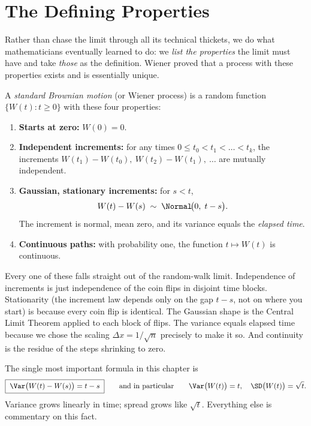 \section{The Defining Properties}
\label{ch29:definition}

Rather than chase the limit through all its technical thickets, we do what
mathematicians eventually learned to do: we \emph{list the properties} the limit
must have and take \emph{those} as the definition. Wiener proved that a process
with these properties exists and is essentially unique.

\begin{definition}
\label{ch29:def-bm}
A \emph{standard Brownian motion} (or Wiener process) is a random function
$\{W(t): t\ge 0\}$ with these four properties:
\begin{enumerate}
  \item \textbf{Starts at zero:} $W(0) = 0$.
  \item \textbf{Independent increments:} for any times
  $0 \le t_0 < t_1 < \dots < t_k$, the increments
  $W(t_1)-W(t_0),\ W(t_2)-W(t_1),\ \dots$ are mutually independent.
  \item \textbf{Gaussian, stationary increments:} for $s<t$,
  \[
    W(t)-W(s) \;\sim\; \Normal\!\big(0,\; t-s\big).
  \]
  The increment is normal, mean zero, and its variance equals the
  \emph{elapsed time}.
  \item \textbf{Continuous paths:} with probability one, the function
  $t\mapsto W(t)$ is continuous.
\end{enumerate}
\end{definition}

Every one of these falls straight out of the random-walk limit. Independence of
increments is just independence of the coin flips in disjoint time blocks.
Stationarity (the increment law depends only on the gap $t-s$, not on where you
start) is because every coin flip is identical. The Gaussian shape is the Central
Limit Theorem applied to each block of flips. The variance equals elapsed time
because we chose the scaling $\Delta x = 1/\sqrt n$ precisely to make it so. And
continuity is the residue of the steps shrinking to zero.

\begin{focusbox}
The single most important formula in this chapter is
\[
  \boxed{\;\Var\big(W(t)-W(s)\big) = t-s\;}\qquad\text{and in particular}\qquad
  \Var\big(W(t)\big) = t,\quad \SD\big(W(t)\big)=\sqrt t.
\]
Variance grows linearly in time; spread grows like $\sqrt t$. Everything else is
commentary on this fact.
\end{focusbox}

